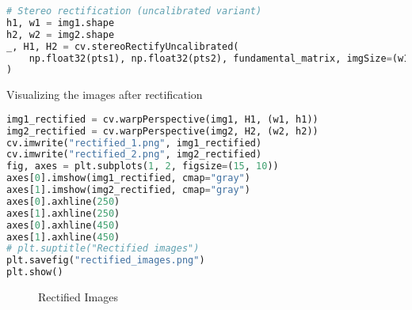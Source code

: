 \begin{center}{\begin{minipage}{0.9\linewidth}
\begin{lstlisting}[language=Python, basicstyle=\fontsize{8}{10}\selectfont\ttfamily]
# Stereo rectification (uncalibrated variant)
h1, w1 = img1.shape
h2, w2 = img2.shape
_, H1, H2 = cv.stereoRectifyUncalibrated(
    np.float32(pts1), np.float32(pts2), fundamental_matrix, imgSize=(w1, h1)
)
\end{lstlisting}
\end{minipage}}\end{center}

Visualizing the images after rectification

\begin{center}{\begin{minipage}{0.9\linewidth}
\begin{lstlisting}[language=Python, basicstyle=\fontsize{8}{10}\selectfont\ttfamily]
img1_rectified = cv.warpPerspective(img1, H1, (w1, h1))
img2_rectified = cv.warpPerspective(img2, H2, (w2, h2))
cv.imwrite("rectified_1.png", img1_rectified)
cv.imwrite("rectified_2.png", img2_rectified)
fig, axes = plt.subplots(1, 2, figsize=(15, 10))
axes[0].imshow(img1_rectified, cmap="gray")
axes[1].imshow(img2_rectified, cmap="gray")
axes[0].axhline(250)
axes[1].axhline(250)
axes[0].axhline(450)
axes[1].axhline(450)
# plt.suptitle("Rectified images")
plt.savefig("rectified_images.png")
plt.show()
\end{lstlisting}
\end{minipage}}\end{center}

\begin{figure}[H]
\centering
\subfloat{\texttt{[image: 5]}}
\caption{Rectified Images}
\end{figure}


